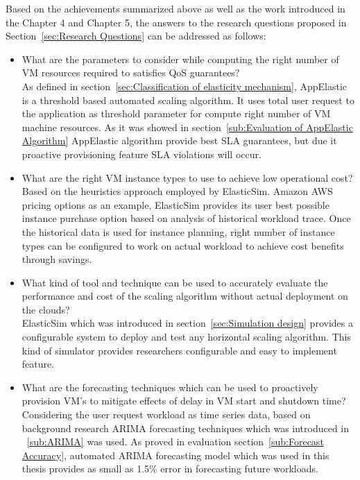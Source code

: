 Based on the achievements summarized above as well as the work introduced in the Chapter 4 and Chapter 5, the answers to the research questions proposed in Section~\ref{sec:Research Questions} can be addressed as follows:
\begin{itemize}
  \item What are the parameters to consider while computing the right number of VM resources required to satisfies QoS guarantees?
  \\
  As defined in section~\ref{sec:Classification of elasticity mechanism}, AppElastic is a threshold based automated scaling algorithm. It uses total user request to the application as threshold parameter for compute right number of VM machine resources. As it was showed in section~\ref{sub:Evaluation of AppElastic Algorithm} AppElastic algorithm provide best SLA guarantees, but due it proactive provisioning feature SLA violations will occur.
  \item What are the right VM instance types to use to achieve low operational cost?
  \\
  Based on the heuristics approach employed by ElasticSim. Amazon AWS pricing options as an example, ElasticSim provides its user best possible instance purchase option based on analysis of historical workload trace. Once the historical data is used for instance planning, right number of instance types can be configured to work on actual workload to achieve cost benefits through savings.
  \item What kind of tool and technique can be used to accurately evaluate the performance and cost of the scaling algorithm without actual deployment on the clouds?
  \\
  ElasticSim which was introduced in section~\ref{sec:Simulation design} provides a configurable system to deploy and test any horizontal scaling algorithm. This kind of simulator provides researchers configurable and easy to implement feature.
  \item What are the forecasting techniques which can be used to proactively provision VM's to mitigate effects of delay in VM start and shutdown time?
  \\
  Considering the user request workload as time series data, based on background research ARIMA forecasting techniques which was introduced in ~\ref{sub:ARIMA} was used. As proved in evaluation section~\ref{sub:Forecast Accuracy}, automated ARIMA forecasting model which was used in this thesis provides as small as 1.5\% error in forecasting future workloads.
\end{itemize}
